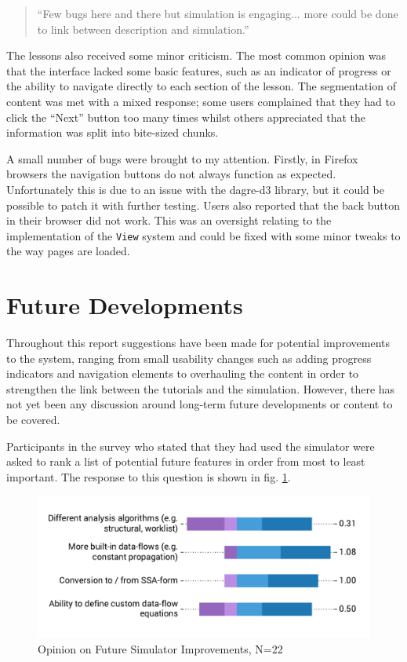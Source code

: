 \documentclass[bsc,twoside,singlespacing,parskip,logo,notimes,normalheadings]{infthesis}
\begin{document}
    \begin{quote}
      ``Few bugs here and there but simulation is engaging... more could
      be done to link between description and simulation.''
    \end{quote}

    The lessons also received some minor criticism. The most common
    opinion was that the interface lacked some basic features, such as
    an indicator of progress or the ability to navigate directly to
    each section of the lesson. The segmentation of content was met
    with a mixed response; some users complained that they had to
    click the ``Next'' button too many times whilst others appreciated
    that the information was split into bite-sized chunks.

    A small number of bugs were brought to my attention. Firstly, in
    Firefox browsers the navigation buttons do not always function as
    expected. Unfortunately this is due to an issue with the dagre-d3
    library, but it could be possible to patch it with further
    testing. Users also reported that the back button in their browser
    did not work. This was an oversight relating to the implementation
    of the {\tt View} system and could be fixed with some minor tweaks
    to the way pages are loaded.

    \section{Future Developments}
    
    Throughout this report suggestions have been made for potential
    improvements to the system, ranging from small usability changes
    such as adding progress indicators and navigation elements to
    overhauling the content in order to strengthen the link between
    the tutorials and the simulation. However, there has not yet been
    any discussion around long-term future developments or content to
    be covered.

    Participants in the survey who stated that they had used the
    simulator were asked to rank a list of potential future features
    in order from most to least important. The response to this
    question is shown in fig. \ref{fig:future-features}.

    \begin{figure}[!htb]
      \centering
      \captionsetup{width=\textwidth, justification=centering}
      \caption{Opinion on Future Simulator Improvements, N=22}\label{fig:future-features}
      \includegraphics[width=\textwidth, trim=0 20 0 20, clip]{img/simulator_improvements.pdf}
    \end{figure}
\end{document}
